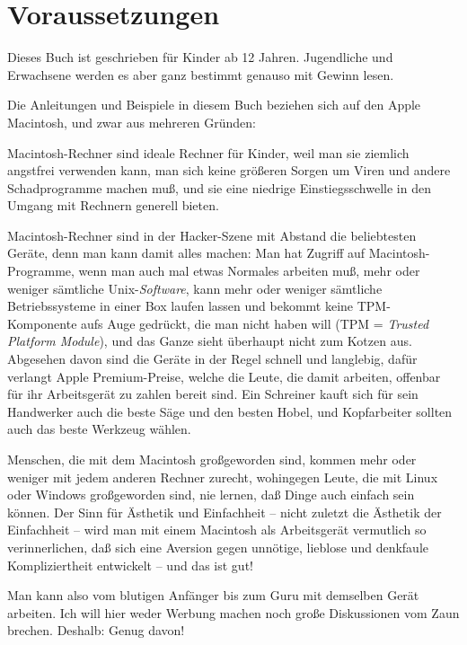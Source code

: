 
\chapter{Voraussetzungen}

Dieses Buch ist geschrieben für Kinder ab 12 Jahren. Jugendliche und Erwachsene werden es aber ganz bestimmt genauso mit Gewinn lesen. 

Die Anleitungen und Beispiele in diesem Buch beziehen sich auf den Apple Macintosh, und zwar aus mehreren Gründen:

\begin{compactitem}[–]
\item Macintosh-Rechner sind ideale Rechner für Kinder, weil man sie ziemlich angstfrei verwenden kann, man sich keine größeren Sorgen um Viren und andere Schadprogramme machen muß, und sie eine niedrige Einstiegsschwelle in den Umgang mit Rechnern generell bieten.
\item Macintosh-Rechner sind in der Hacker-Szene mit Abstand die beliebtesten Geräte, denn man kann damit alles machen: Man hat Zugriff auf Macintosh-Programme, wenn man auch mal etwas Normales arbeiten muß, mehr oder weniger sämtliche Unix-\emph{Software}, kann mehr oder weniger sämtliche Betriebssysteme in einer Box laufen lassen und bekommt keine TPM-Komponente aufs Auge gedrückt, die man nicht haben will (TPM = \emph{Trusted Platform Module}), und das Ganze sieht überhaupt nicht zum Kotzen aus. Abgesehen davon sind die Geräte in der Regel schnell und langlebig, dafür verlangt Apple Premium-Preise, welche die Leute, die damit arbeiten, offenbar für ihr Arbeitsgerät zu zahlen bereit sind. Ein Schreiner kauft sich für sein Handwerker auch die beste Säge und den besten Hobel, und Kopfarbeiter sollten auch das beste Werkzeug wählen.
\item Menschen, die mit dem Macintosh großgeworden sind, kommen mehr oder weniger mit jedem anderen Rechner zurecht, wohingegen Leute, die mit Linux oder Windows großgeworden sind, nie lernen, daß Dinge auch einfach sein können. Der Sinn für Ästhetik und Einfachheit – nicht zuletzt die Ästhetik der Einfachheit – wird man mit einem Macintosh als Arbeitsgerät vermutlich so verinnerlichen, daß sich eine Aversion gegen unnötige, lieblose und denkfaule Kompliziertheit entwickelt – und das ist gut!
\end{compactitem}

\noindent Man kann also vom blutigen Anfänger bis zum Guru mit demselben Gerät arbeiten. Ich will hier weder Werbung machen noch große Diskussionen vom Zaun brechen. Deshalb: Genug davon!


